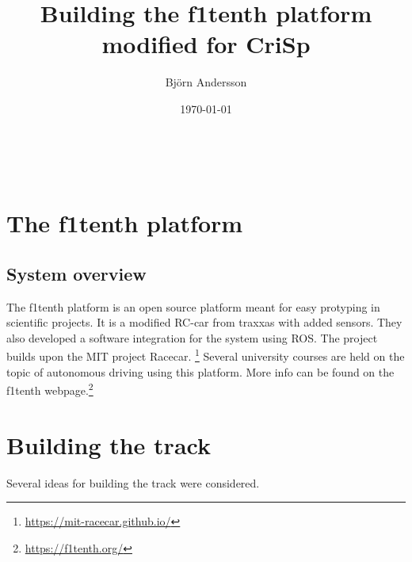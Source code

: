 \documentclass{article}
\title{Building the f1tenth platform modified for CriSp}
\author{Björn Andersson}
\date{\today }
\begin{document}
\maketitle

\newpage

\tableofcontents

\newpage
\newpage

\listoffigures

\newpage
\ %
\newpage

\section{The f1tenth platform}
	\subsection{System overview}
	The f1tenth platform is an open source platform meant for easy protyping in scientific projects. It is a modified RC-car from traxxas with added sensors. They also developed a software integration for the system using ROS. The project builds upon the MIT project Racecar. \footnote{\url{https://mit-racecar.github.io/}} Several university courses are held on the topic of autonomous driving using this platform. More info can be found on the f1tenth webpage.\footnote{\url{https://f1tenth.org/}}

\newpage

\section{Building the track}
Several ideas for building the track were considered. 
\end{document}
